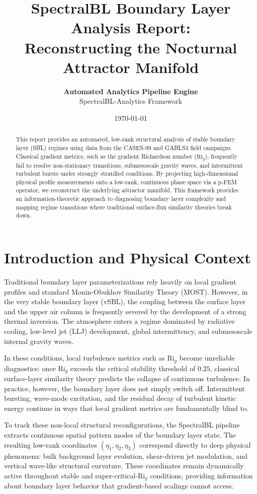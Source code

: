 \documentclass[11pt,a4paper]{article}
\title{\textbf{SpectralBL Boundary Layer Analysis Report:}\\
       \large Reconstructing the Nocturnal Attractor Manifold}
\author{\textbf{Automated Analytics Pipeline Engine}\\
        \small SpectralBL-Analytics Framework}
\date{\today}
\begin{document}
\maketitle

\begin{abstract}
This report provides an automated, low-rank structural analysis of stable boundary layer (SBL) regimes using data from the CASES-99 and GABLS3 field campaigns. Classical gradient metrics, such as the gradient Richardson number ($\mathrm{Ri}_g$), frequently fail to resolve non-stationary transitions, submesoscale gravity waves, and intermittent turbulent bursts under strongly stratified conditions. By projecting high-dimensional physical profile measurements onto a low-rank, continuous phase space via a p-FEM operator, we reconstruct the underlying attractor manifold. This framework provides an information-theoretic approach to diagnosing boundary layer complexity and mapping regime transitions where traditional surface-flux similarity theories break down.
\end{abstract}

\section{Introduction and Physical Context}

Traditional boundary layer parameterizations rely heavily on local gradient profiles and standard Monin-Obukhov Similarity Theory (MOST). However, in the very stable boundary layer (vSBL), the coupling between the surface layer and the upper air column is frequently severed by the development of a strong thermal inversion. The atmosphere enters a regime dominated by radiative cooling, low-level jet (LLJ) development, global intermittency, and submesoscale internal gravity waves.

In these conditions, local turbulence metrics such as $\mathrm{Ri}_g$ become unreliable diagnostics: once $\mathrm{Ri}_g$ exceeds the critical stability threshold of $0.25$, classical surface-layer similarity theory predicts the collapse of continuous turbulence. In practice, however, the boundary layer does not simply switch off. Intermittent bursting, wave-mode excitation, and the residual decay of turbulent kinetic energy continue in ways that local gradient metrics are fundamentally blind to.

To track these non-local structural reconfigurations, the SpectralBL pipeline extracts continuous spatial pattern modes of the boundary layer state. The resulting low-rank coordinates $(\eta_1, \eta_2, \eta_3)$ correspond directly to deep physical phenomena: bulk background layer evolution, shear-driven jet modulation, and vertical wave-like structural curvature. These coordinates remain dynamically active throughout stable and super-critical-$\mathrm{Ri}_g$ conditions, providing information about boundary layer behavior that gradient-based scalings cannot access.
\end{document}
